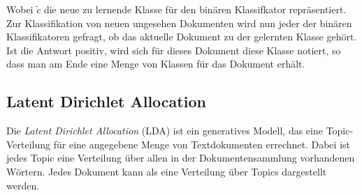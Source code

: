 Wobei $\tilde c$ die neue zu lernende Klasse für den binären Klassifkator repräsentiert.
Zur Klassifikation von neuen ungesehen Dokumenten wird nun jeder der binären Klassifikatoren gefragt, ob das aktuelle Dokument zu der gelernten Klasse gehört.
Ist die Antwort positiv, wird sich für dieses Dokument diese Klasse notiert, so dass man am Ende eine Menge von Klassen für das Dokument erhält.


\subsection{Latent Dirichlet Allocation}
\label{sub:latent_dirichlet_allocation}

Die \emph{Latent Dirichlet Allocation} (LDA) ist ein generatives Modell, das eine Topic-Verteilung für eine angegebene Menge von Textdokumenten errechnet.
Dabei ist jedes Topic eine Verteilung über allen in der Dokumentensammlung vorhandenen Wörtern.
Jedes Dokument kann als eine Verteilung über Topics dargestellt werden.




